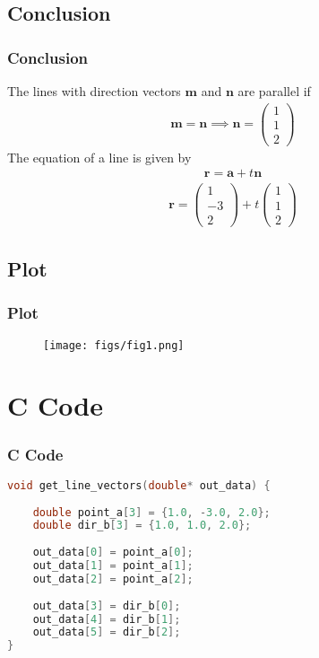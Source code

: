 \documentclass{beamer}
\theoremstyle{remark}
\newcommand{\myvec}[1]{\ensuremath{\begin{pmatrix}#1\end{pmatrix}}}
\let\vec\mathbf
\numberwithin{equation}{section}
\begin{document}
\subsection{Conclusion}
\begin{frame}
\frametitle{Conclusion}
 The lines with direction vectors $\vec{m}$ and $\vec{n}$ are parallel if
\begin{align}
\vec{m}=\vec{n}  \implies  \vec{n}=\myvec{1\\1\\2}
\end{align}
The equation of a line is given by
\begin{align}
\vec{r}=\vec{a}+t\vec{n}
\end{align}
\begin{align}
\vec{r}=\myvec{1\\-3\\2}+t\myvec{1\\1\\2}
\end{align}
\end{frame}

\subsection{Plot}
\begin{frame}[fragile]
\frametitle{Plot}

\begin{figure}[h!]
   \centering
   \texttt{[image: figs/fig1.png]}
	\caption{}
   \label{}
\end{figure}
\end{frame}

\section{C Code}
\begin{frame}[fragile]
\frametitle{C Code}
\begin{lstlisting}[language=C]
void get_line_vectors(double* out_data) {
 
    double point_a[3] = {1.0, -3.0, 2.0};
    double dir_b[3] = {1.0, 1.0, 2.0};
    
    out_data[0] = point_a[0];
    out_data[1] = point_a[1];
    out_data[2] = point_a[2];
    
    out_data[3] = dir_b[0];
    out_data[4] = dir_b[1];
    out_data[5] = dir_b[2];
}
    \end{lstlisting}
\end{frame}
\end{document}
